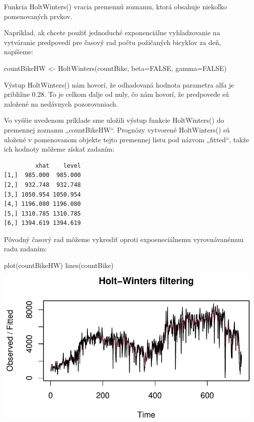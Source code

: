 \documentclass[
  letterpaper,
  DIV=11,
  numbers=noendperiod]{scrreprt}
\newenvironment{Shaded}{\begin{snugshade}}{\end{snugshade}}
\newcommand{\AttributeTok}[1]{\textcolor[rgb]{0.40,0.45,0.13}{#1}}
\newcommand{\ConstantTok}[1]{\textcolor[rgb]{0.56,0.35,0.01}{#1}}
\newcommand{\FunctionTok}[1]{\textcolor[rgb]{0.28,0.35,0.67}{#1}}
\newcommand{\NormalTok}[1]{\textcolor[rgb]{0.00,0.23,0.31}{#1}}
\newcommand{\OtherTok}[1]{\textcolor[rgb]{0.00,0.23,0.31}{#1}}
\newcommand{\SpecialCharTok}[1]{\textcolor[rgb]{0.37,0.37,0.37}{#1}}
\begin{document}
Funkcia HoltWinters() vracia premennú zoznamu, ktorá obsahuje niekoľko
pomenovaných prvkov.

Napríklad, ak chcete použiť jednoduché exponenciálne vyhladzovanie na
vytváranie predpovedí pre časový rad počtu požičaných bicyklov za deň,
napíšeme:

\begin{Shaded}
\begin{Highlighting}[]
\NormalTok{countBikeHW }\OtherTok{\textless{}{-}} \FunctionTok{HoltWinters}\NormalTok{(countBike, }\AttributeTok{beta=}\ConstantTok{FALSE}\NormalTok{, }\AttributeTok{gamma=}\ConstantTok{FALSE}\NormalTok{)}
\end{Highlighting}
\end{Shaded}

Výstup HoltWinters() nám hovorí, že odhadovaná hodnota parametra alfa je
približne 0.28. To je celkom ďalje od nuly, čo nám hovorí, že predpovede
sú založené na nedávnych pozorovaniach.

Vo vyššie uvedenom príklade sme uložili výstup funkcie HoltWinters() do
premennej zoznamu „countBikeHW``. Prognózy vytvorené HoltWinters() sú
uložené v pomenovanom objekte tejto premennej listu pod názvom
„fitted``, takže ich hodnoty môžeme získať zadaním:

\begin{Shaded}
\end{Shaded}

\begin{verbatim}
         xhat    level
[1,]  985.000  985.000
[2,]  932.748  932.748
[3,] 1050.954 1050.954
[4,] 1196.080 1196.080
[5,] 1310.785 1310.785
[6,] 1394.619 1394.619
\end{verbatim}

Pôvodný časový rad môžeme vykresliť oproti expoeneciálnemu
vyrovnávanémuu radu zadaním:

\begin{Shaded}
\begin{Highlighting}[]
\FunctionTok{plot}\NormalTok{(countBikeHW)}
\FunctionTok{lines}\NormalTok{(countBike)}
\end{Highlighting}
\end{Shaded}

\includegraphics{prednaska2_HoltWinters_files/figure-pdf/unnamed-chunk-5-1.pdf}
\end{document}
